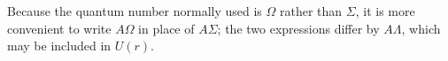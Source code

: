 Because the quantum number normally used is $\Omega$ rather than $\Sigma$, it is more convenient to write $A\Omega$ in place of $A\Sigma$; the two expressions differ by $A\Lambda$, which may be included in $U(r)$.
